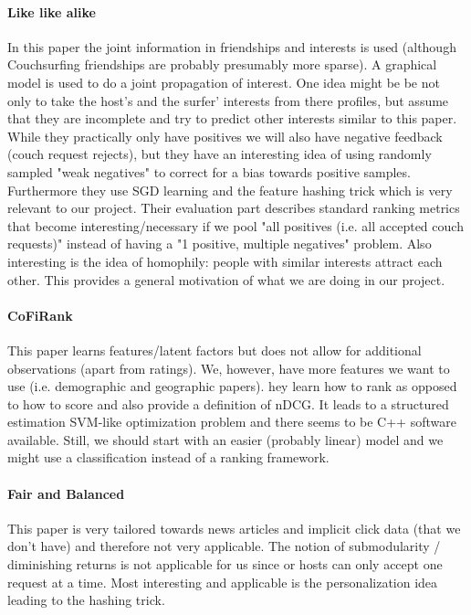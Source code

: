 \documentclass[11pt]{article}
\begin{document}
\paragraph{Like like alike} \cite{Yang2011}
In this paper the joint information in friendships and interests is used (although Couchsurfing friendships are probably presumably more sparse).
A graphical model is used to do a joint propagation of interest.
One idea might be be not only to take the host's and the surfer' interests from there profiles, but assume that they are incomplete and try to predict other interests similar to this paper. While they practically only have positives we will also have negative feedback (couch request rejects), but they have an interesting idea of using randomly sampled "weak negatives" to correct for a bias towards positive samples.
Furthermore they use SGD learning and the feature hashing trick which is very relevant to our project.
Their evaluation part describes standard ranking metrics that become interesting/necessary if we pool "all positives (i.e. all accepted couch requests)" instead of having a "1 positive, multiple negatives" problem.
Also interesting is the idea of homophily: people with similar interests attract each other. This provides a general motivation of what we are doing in our project.

\paragraph{CoFiRank} \cite{Weimer2009}
This paper learns features/latent factors but does not allow for additional observations (apart from ratings).
We, however, have more features we want to use (i.e. demographic and geographic papers).
hey learn how to rank as opposed to how to score and also provide a definition of nDCG.
It leads to a structured estimation SVM-like optimization problem and there seems to be C++ software available.
Still, we should start with an easier (probably linear) model and we might use a classification instead of a ranking framework.

\paragraph{Fair and Balanced} \cite{Ahmed2012}
This paper is very tailored towards news articles and implicit click data (that we don't have) and therefore not very applicable.
The notion of submodularity / diminishing returns is not applicable for us since or hosts can only accept one request at a time.
Most interesting and applicable is the personalization idea leading to the hashing trick.
\end{document}
